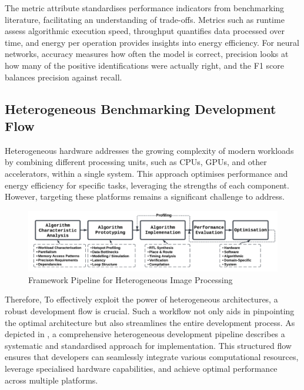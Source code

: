 The metric attribute standardises performance indicators from benchmarking literature, facilitating an understanding of trade-offs. Metrics such as runtime assess algorithmic execution speed, throughput quantifies data processed over time, and energy per operation provides insights into energy efficiency. For neural networks, accuracy measures how often the model is correct, precision looks at how many of the positive identifications were actually right, and the F1 score balances precision against recall.

\subsection{Heterogeneous Benchmarking Development Flow}\label{sec:introframework}

Heterogeneous hardware addresses the growing complexity of modern workloads by combining different processing units, such as CPUs, GPUs, and other accelerators, within a single system. This approach optimises performance and energy efficiency for specific tasks, leveraging the strengths of each component. However, targeting these platforms remains a significant challenge to address.

\begin{figure}[H]
\centering
\includegraphics[width=\linewidth]{Images/Bencmark Flow.png}
\caption[Framework Pipeline]{Framework Pipeline for Heterogeneous Image Processing }
\label{fig:FrameworkFlow}
\end{figure}

Therefore, To effectively exploit the power of heterogeneous architectures, a robust development flow is crucial. Such a workflow not only aids in pinpointing the optimal architecture but also streamlines the entire development process. As depicted in , a comprehensive heterogeneous development pipeline describes a systematic and standardised approach for implementation. This structured flow ensures that developers can seamlessly integrate various computational resources, leverage specialised hardware capabilities, and achieve optimal performance across multiple platforms.

